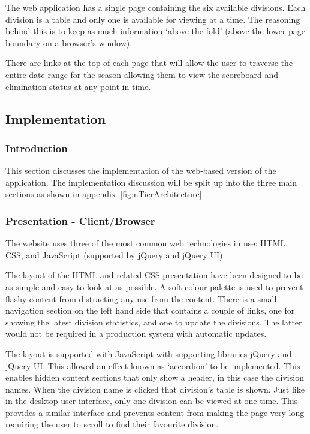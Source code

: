 The web application has a single page containing the six available divisions.
Each division is a table and only one is available for viewing at a time. The 
reasoning behind this is to keep as much information `above the fold' (above the
lower page boundary on a browser's window).

There are links at the top of each page that will allow the user to traverse
the entire date range for the season allowing them to view the scoreboard and
elimination status at any point in time.

\subsection{Implementation}

\subsubsection{Introduction}

This section discusses the implementation of the web-based version of the
application. The implementation discussion will be split up into the three
main sections as shown in appendix~\ref{fig:nTierArchitecture}.

\subsubsection{Presentation - Client/Browser}

The website uses three of the most common web technologies in use: HTML, CSS,
and JavaScript (supported by jQuery and jQuery UI).

The layout of the HTML and related CSS presentation have been designed to be
as simple and easy to look at as possible. A soft colour palette is used to
prevent flashy content from distracting any use from the content. There is
a small navigation section on the left hand side that contains a couple of
links, one for showing the latest division statistics, and one to update
the divisions. The latter would not be required in a production system with
automatic updates.

The layout is supported with JavaScript with supporting libraries jQuery and
jQuery UI. This allowed an effect known as `accordion' to be implemented. This
enables hidden content sections that only show a header, in this case the
division names. When the division name is clicked that division's table is
shown. Just like in the desktop user interface, only one division can be viewed
at one time. This provides a similar interface and prevents content from
making the page very long requiring the user to scroll to find their
favourite division.

